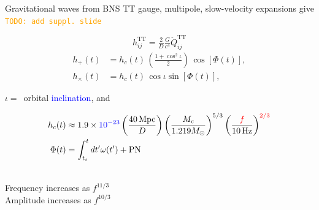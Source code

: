 \documentclass[xcolor=dvipsnames,handout,t]{beamer}
\newcommand{\todo}[1]{\textcolor{orange}{\texttt{TODO: #1}}}
\newcommand{\red}[1]{\textcolor{red}{#1}}
\newcommand{\bl}[1]{\textcolor{blue}{#1}}
\newcommand{\f}{\frac}
\newcommand{\nn}{\nonumber}
\begin{document}
\begin{frame}{Gravitational waves from BNS}
  TT gauge, multipole, slow-velocity expansions give \todo{add suppl. slide}
  \begin{small}
    \[
    h_{ij}^\text{TT} = \tfrac{2}{D}\tfrac{G}{c^4} \ddot{Q}_{ij}^\text{TT}%
    \]
    \vspace{-5mm}
    \begin{align*}
    h_+(t) &= h_c(t)\, \left(\f{1+\cos^2\iota}{2}\right)\, \cos[\Phi(t)],\\
    h_\times(t) & =h_c(t)\,\cos\iota \sin[\Phi(t)],
    \end{align*}
  \end{small}
  $\iota =\,$ orbital \bl{inclination}, and
  \vspace{-3mm}
  \begin{small}
    \begin{align*}
    h_c(t) %
    &\approx 1.9\times \bl{10^{-23}} \left(\f{40\,\text{Mpc}}{D}\right)\left(\f{M_c}{1.219 M_\odot}\right)^{5/3}\left(\frac{\red{f}}{10\,\text{Hz}}\right)^{\red{2/3}} \nn\\
    \Phi(t) &=\int_{t_i}^t dt' \omega(t') + \text{PN}
    \end{align*}
  \end{small}\\
  Frequency increases as $f^{11/3}$\\
  Amplitude increases as $f^{10/3} $
\end{frame}
\end{document}

